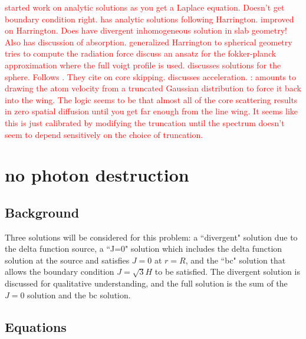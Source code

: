\documentclass{aastex63}
\newcommand{\todo}[1]{\textcolor{red}{#1}}
\begin{document}
\ifx
\todo{
\citet{1973MNRAS.162...43H, 1974MNRAS.166..373H} started work on analytic solutions as you get a Laplace equation. Doesn't get boundary condition right.
\citet{1990ApJ...350..216N} has analytic solutions following Harrington.
\citet{1990ApJ...350..216N} improved on Harrington. Does have divergent inhomogeneous solution in slab geometry! Also has discussion of absorption.
\citet{2006ApJ...649...14D} generalized Harrington to spherical geometry
\citet{1976ApJ...208..286W} tries to compute the radiation force
\citet{1994ApJ...427..603R} discuss an ansatz for the fokker-planck approximation where the full voigt profile is used.
\citet{2020arXiv200509692L} discusses solutions for the sphere. Follows \citet{2006ApJ...649...14D}. They cite \citet{2015MNRAS.449.4336S} on core skipping.
\citet{2002ApJ...567..922A,2015MNRAS.449.4336S} discusses acceleration.
\citet{2015MNRAS.449.4336S}: amounts to drawing the atom velocity from a truncated Gaussian distribution to force it back into the wing.  The logic seems to be that almost all of the core scattering results in zero spatial diffusion until you get far enough from the line wing.  It seems like this is just calibrated by modifying the truncation until the spectrum doesn’t seem to depend sensitively on the choice of truncation.  
}
\fi
\section{ no photon destruction }
\label{sec:no_destruction}


\subsection{Background}
\label{subsec:no_destruction:background}

Three solutions will be considered for this problem: a ``divergent" solution due to the delta function source, a ``J=0" solution which includes the delta function solution at the source and satisfies $J=0$ at $r=R$, and the ``bc" solution that allows the boundary condition $J=\sqrt{3}H$ to be satisfied. The divergent solution is discussed for qualitative understanding, and the full solution is the sum of the $J=0$ solution and the bc solution.

\subsection{Equations}
\label{subsec:no_destruction:equations}
\end{document}

